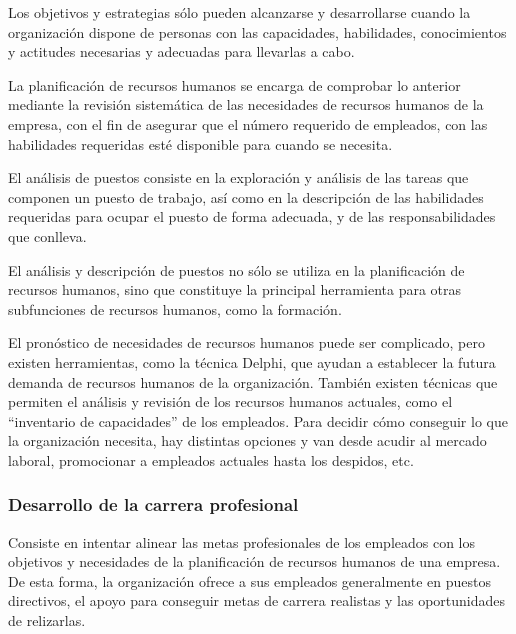 \documentclass[10pt,a4paper,spanish]{report}
\begin{document}
                  Los objetivos y estrategias sólo pueden alcanzarse y desarrollarse cuando la organización dispone de personas con las capacidades, habilidades, conocimientos y actitudes necesarias y adecuadas para llevarlas a cabo.

                  La planificación de recursos humanos se encarga de comprobar lo anterior mediante la revisión sistemática de las necesidades de recursos humanos de la empresa, con el fin de asegurar que el número requerido de empleados, con las habilidades requeridas esté disponible para cuando se necesita.

                  El análisis de puestos consiste en la exploración y análisis de las tareas que componen un puesto de trabajo, así como en la descripción de las habilidades requeridas para ocupar el puesto de forma adecuada, y de las responsabilidades que conlleva.

                  El análisis y descripción de puestos no sólo se utiliza en la planificación de recursos humanos, sino que constituye la principal herramienta para otras subfunciones de recursos humanos, como la formación.

                  El pronóstico de necesidades de recursos humanos puede ser complicado, pero existen herramientas, como la técnica Delphi, que ayudan a establecer la futura demanda de recursos humanos de la organización. También existen técnicas que permiten el análisis y revisión de los recursos humanos actuales, como el ``inventario de capacidades'' de los empleados. Para decidir cómo conseguir lo que la organización necesita, hay distintas opciones y van desde acudir al mercado laboral, promocionar a empleados actuales hasta los despidos, etc.

                  \subsubsection{\textcolor[rgb]{0.8,0.2,0.8}Desarrollo de la carrera profesional}

                        Consiste en intentar alinear las metas profesionales de los empleados con los objetivos y necesidades de la planificación de recursos humanos de una empresa. De esta forma, la organización ofrece a sus empleados generalmente en puestos directivos, el apoyo para conseguir metas de carrera realistas y las oportunidades de relizarlas.
\end{document}
